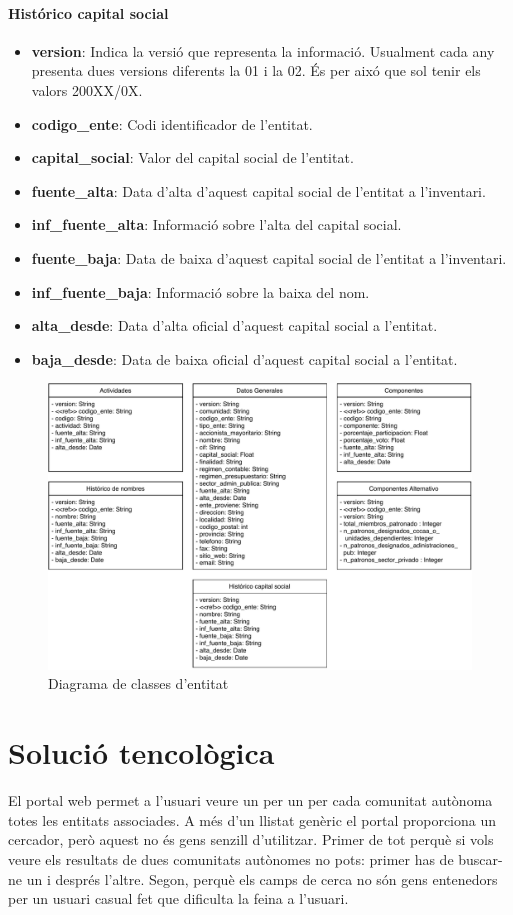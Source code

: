 \documentclass[12pt]{article}
\begin{document}
\paragraph{Histórico capital social\\}
\begin{itemize}
    \item \textbf{version}: Indica la versió que representa la informació. Usualment cada any presenta dues versions diferents la 01 i la 02. És per aixó que sol tenir els valors 200XX/0X.
    \item \textbf{codigo\_ente}: Codi identificador de l'entitat.
    \item \textbf{capital\_social}: Valor del capital social de l'entitat.
    \item \textbf{fuente\_alta}: Data d'alta d'aquest capital social de l'entitat a l'inventari.
    \item \textbf{inf\_fuente\_alta}: Informació sobre l'alta del capital social.
    \item \textbf{fuente\_baja}: Data de baixa d'aquest capital social de l'entitat a l'inventari.
    \item \textbf{inf\_fuente\_baja}: Informació sobre la baixa del nom.
    \item \textbf{alta\_desde}: Data d'alta oficial d'aquest capital social a l'entitat.
    \item \textbf{baja\_desde}: Data de baixa oficial d'aquest capital social a l'entitat.
\end{itemize}

\begin{figure}[H]
    \centering
    \includegraphics[width=0.7\columnwidth]{img/diagrama_classes_entitat.pdf}
    \caption{Diagrama de classes d'entitat} 
    \label{clasesentitat}
\end{figure}

\section*{Solució tencològica}
El portal web permet a l'usuari veure un per un per cada comunitat autònoma totes les entitats associades. A més d'un llistat genèric el portal proporciona un cercador, però aquest no és gens senzill d'utilitzar. Primer de tot perquè si vols veure els resultats de dues comunitats autònomes no pots: primer has de buscar-ne un i després l'altre. Segon, perquè els camps de cerca no són gens entenedors per un usuari casual fet que dificulta la feina a l'usuari.\par
\end{document}
